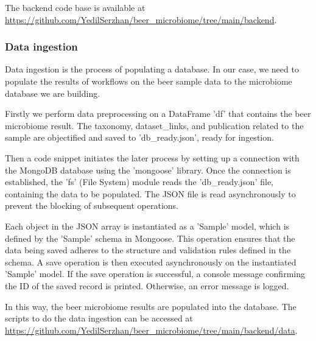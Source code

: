             The backend code base is available at \url{https://github.com/YedilSerzhan/beer_microbiome/tree/main/backend}. 
                
        \subsubsection{Data ingestion}

        Data ingestion is the process of populating a database. In our case, we need to populate the results of workflows on the beer sample data to the microbiome database we are building.

        Firstly we perform data preprocessing on a DataFrame 'df' that contains the beer microbiome result. The taxonomy, dataset\_links, and publication related to the sample are objectified and saved to 'db\_ready.json', ready for ingestion.
                
        Then a code snippet initiates the later process by setting up a connection with the MongoDB database using the 'mongoose' library. Once the connection is established, the 'fs' (File System) module reads the 'db\_ready.json' file, containing the data to be populated. The JSON file is read asynchronously to prevent the blocking of subsequent operations.
        
        Each object in the JSON array is instantiated as a 'Sample' model, which is defined by the 'Sample' schema in Mongoose. This operation ensures that the data being saved adheres to the structure and validation rules defined in the schema. A save operation is then executed asynchronously on the instantiated 'Sample' model. If the save operation is successful, a console message confirming the ID of the saved record is printed. Otherwise, an error message is logged.
        
        In this way, the beer microbiome results are populated into the database. The scripts to do the data ingestion can be accessed at \url{https://github.com/YedilSerzhan/beer_microbiome/tree/main/backend/data}.
        